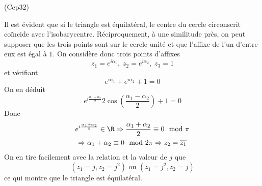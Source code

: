 \begin{tiny}(Ccp32)\end{tiny} Il est évident que si le triangle est équilatéral, le centre du cercle circonscrit coïncide avec l'isobarycentre.\newline
Réciproquement, à une similitude près, on peut supposer que les trois points sont sur le cercle unité et que l'affixe de l'un d'entre eux est égal à $1$.\newline
On considère donc trois points d'affixes 
\begin{displaymath}
 z_1=e^{i\alpha_1},\; z_2 = e^{i\alpha_2},\; z_3 = 1 
\end{displaymath}
et vérifiant
\begin{displaymath}
 e^{i\alpha_1} + e^{i\alpha_2} + 1 = 0 
\end{displaymath}
On en déduit
\begin{displaymath}
 e^{i\frac{\alpha_1 + \alpha_2}{2}} 2 \cos\left(\frac{\alpha_1 - \alpha_2}{2} \right)  + 1 = 0 
\end{displaymath}
Donc
\begin{multline*}
 e^{i\frac{\alpha_1 + \alpha_2}{2}}\in \R
\Rightarrow 
\frac{\alpha_1 + \alpha_2}{2} \equiv 0 \mod \pi \\
\Rightarrow  \alpha_1 + \alpha_2 \equiv 0 \mod 2\pi
\Rightarrow z_2 = \overline{z_1}
\end{multline*}
On en tire facilement avec la relation et la valeur de $j$ que
\begin{displaymath}
 \left( z_1=j, z_2 = j^2\right) \text{ ou } \left( z_1=j^2, z_2 = j\right) 
\end{displaymath}
ce qui montre que le triangle est équilatéral.